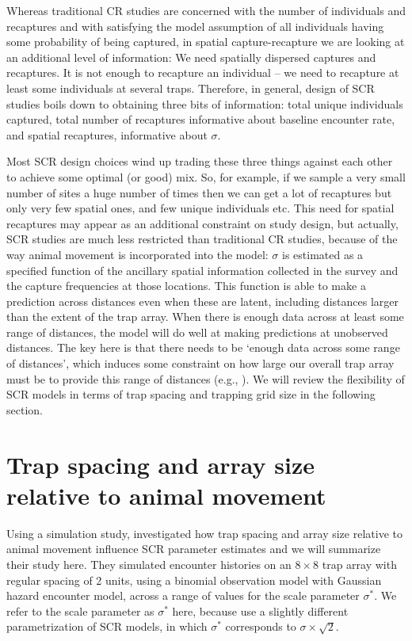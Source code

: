 Whereas traditional CR studies are concerned with the number of
individuals and recaptures and with satisfying the model assumption of
all individuals having some probability of being captured, in spatial
capture-recapture we are looking at an additional level of
information: We need spatially dispersed captures and
recaptures. 
It is not enough to recapture an individual -- 
we need to recapture at least some individuals at several
traps. Therefore, in general, design of SCR studies boils down to
obtaining three bits of information: total unique
individuals captured,
total number of recaptures
informative about baseline encounter
rate, and spatial recaptures, informative about $\sigma$.

Most SCR
design choices wind up trading these three things against each other
to achieve some optimal (or good) mix. So, for example, if we sample a
very small number of sites a huge number of times then we can get a
lot of recaptures but only very few spatial ones, and few unique
individuals etc.  This need for spatial recaptures may appear as an
additional constraint on study design, but actually, SCR studies are
much less restricted than traditional CR studies, because of the way
animal movement is incorporated into the model: $\sigma$ is estimated
as a specified function of the ancillary spatial information collected
in the survey and the capture frequencies at those locations. This
function is able to make a prediction across distances even when these
are latent, including distances larger than the extent of the trap
array. When there is enough data across at least some range of
distances, the model will do well at making predictions at unobserved
distances. The key here is that there needs to be `enough data across
some range of distances', which induces some constraint on how large
our overall trap array must be to provide this range of distances
(e.g., \citealp{marques_etal:2011, efford:2011ecol}). We will review the flexibility of
SCR models in terms of trap spacing and trapping grid size in the
following section.


\section{Trap spacing and array size relative to animal movement}


Using a simulation study, \citet{sollmann_etal:2012} investigated how
trap spacing and array size relative to animal movement influence SCR
parameter estimates and we will summarize their study here. They
simulated encounter histories on an $8 \times 8$ trap array with
regular spacing of 2 units, using a binomial
observation model with
Gaussian hazard encounter model, across a
range of values for the scale parameter $\sigma^*$. We refer to the
scale parameter as $\sigma^*$ here, because
\citet{sollmann_etal:2012} use a slightly different parametrization of
SCR models, in which $\sigma^*$ corresponds to $\sigma\times\sqrt{2}$.

